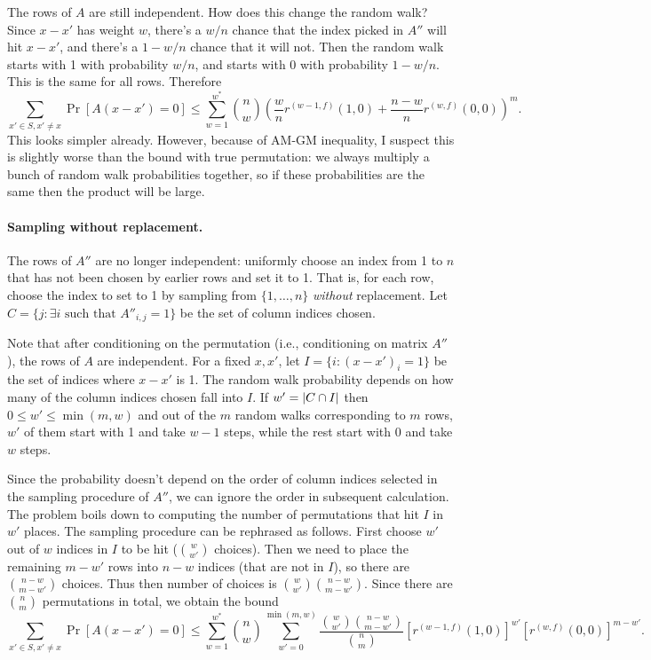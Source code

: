 \documentclass[11pt]{article}
\begin{document}
The rows of $A$ are still independent.
How does this change the random walk?
Since $x - x'$ has weight $w$, there's a $w/n$ chance that the index picked in
$A''$ will hit $x - x'$, and there's a $1 - w/n$ chance that it will not.
Then the random walk starts with 1 with probability $w/n$, and starts with 0
with probability $1-w/n$.
This is the same for all rows.
Therefore
\begin{equation}
  \sum_{x' \in S, x' \neq x} \Pr[A(x - x') = 0] \leq \sum_{w=1}^{w^*} \binom{n}{w} \left(
    \frac{w}{n} r^{(w-1, f)}(1, 0) + \frac{n-w}{n} r^{(w, f)}(0, 0)\right)^m. 
  \label{eq:k_1_with_replacement}
\end{equation}
This looks simpler already.
However, because of AM-GM inequality, I suspect this is slightly worse than the
bound with true permutation: we always multiply a bunch of random walk
probabilities together, so if these probabilities are the same then the product
will be large.

\paragraph{Sampling without replacement.}
The rows of $A''$ are no longer independent: uniformly choose an index from 1 to
$n$ that has not been chosen by earlier rows and set it to 1.
That is, for each row, choose the index to set to 1 by sampling from $\{ 1,
\dots, n \}$ \emph{without} replacement.
Let $C = \{ j \colon \exists i \text{ such that } A''_{i, j} = 1 \}$ be the set of
column indices chosen.

Note that after conditioning on the permutation (i.e., conditioning on matrix
$A''$), the rows of $A$ are independent.
For a fixed $x, x'$, let $I = \{ i \colon (x - x')_i = 1 \}$ be the set of
indices where $x - x'$ is 1.
The random walk probability depends on how many of the column indices chosen
fall into $I$.
If $w' = \left\lvert C \cap I\right\rvert$ then $0 \leq w' \leq \min(m, w)$ and out of the $m$ random walks
corresponding to $m$ rows, $w'$ of them start with 1 and take $w - 1$ steps,
while the rest start with 0 and take $w$ steps.

Since the probability doesn't depend on the order of column indices selected in
the sampling procedure of $A''$, we can ignore the order in subsequent
calculation.
The problem boils down to computing the number of permutations that hit $I$ in
$w'$ places.
The sampling procedure can be rephrased as follows. 
First choose $w'$ out of $w$ indices in $I$ to be hit ($\binom{w}{w'}$ choices).
Then we need to place the remaining $m - w'$ rows into $n - w$ indices (that are
not in $I$), so there are $\binom{n - w}{m - w'}$ choices.
Thus then number of choices is $\binom{w}{w'} \binom{n - w}{m - w'}$.
Since there are $\binom{n}{m}$ permutations in total, we obtain the bound
\begin{equation}
  \sum_{x' \in S, x' \neq x} \Pr[A(x - x') = 0] \leq \sum_{w=1}^{w^*} \binom{n}{w}
  \sum_{w'=0}^{\min(m, w)}\frac{\binom{w}{w'} \binom{n - w}{m - w'}}{\binom{n}{m}}
  [r^{(w-1, f)}(1, 0)]^{w'} [r^{(w, f)}(0, 0)]^{m-w'}.  
  \label{eq:k_1_without_replacment}
\end{equation}
\end{document}
